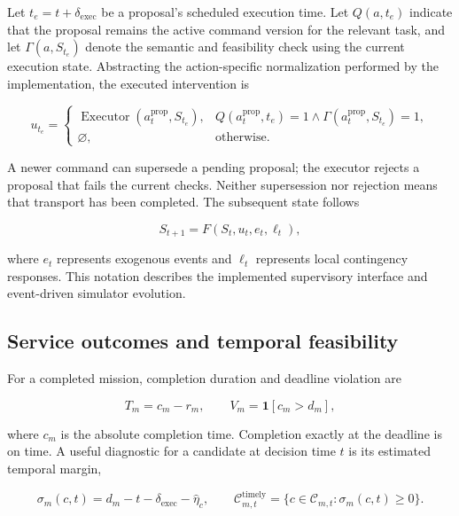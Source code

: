 \documentclass[]{interact}
\theoremstyle{plain}
\theoremstyle{definition}
\theoremstyle{remark}
\begin{document}
Let $t_e=t+\delta_{\mathrm{exec}}$ be a proposal's scheduled execution time. Let $Q(a,t_e)$ indicate that the proposal remains the active command version for the relevant task, and let $\Gamma(a,S_{t_e})$ denote the semantic and feasibility check using the current execution state. Abstracting the action-specific normalization performed by the implementation, the executed intervention is

\begin{equation*}
u_{t_e}=\begin{cases}
\operatorname{Executor}(a_t^{\mathrm{prop}},S_{t_e}),
&Q(a_t^{\mathrm{prop}},t_e)=1\land\Gamma(a_t^{\mathrm{prop}},S_{t_e})=1,\\
\varnothing,&\text{otherwise}.
\end{cases} \tag{5}
\end{equation*}

A newer command can supersede a pending proposal; the executor rejects a proposal that fails the current checks. Neither supersession nor rejection means that transport has been completed. The subsequent state follows

\begin{equation*}
S_{t+1}=F(S_t,u_t,e_t,\ell_t), \tag{6}
\end{equation*}

where $e_t$ represents exogenous events and $\ell_t$ represents local contingency responses. This notation describes the implemented supervisory interface and event-driven simulator evolution.

\subsection{Service outcomes and temporal feasibility}

For a completed mission, completion duration and deadline violation are

\begin{equation*}
T_m=c_m-r_m,\qquad V_m=\mathbf1[c_m>d_m], \tag{7}
\end{equation*}

where $c_m$ is the absolute completion time. Completion exactly at the deadline is on time. A useful diagnostic for a candidate at decision time $t$ is its estimated temporal margin,

\begin{equation*}
\sigma_m(c,t)=d_m-t-\delta_{\mathrm{exec}}-\widehat\eta_c,\qquad
\mathcal C^{\mathrm{timely}}_{m,t}=\{c\in\mathcal C_{m,t}:\sigma_m(c,t)\ge0\}. \tag{8}
\end{equation*}
\end{document}

